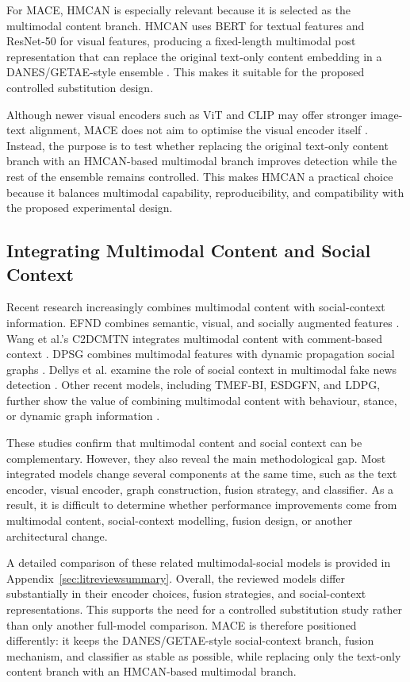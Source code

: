 For MACE, HMCAN is especially relevant because it is selected as the multimodal content branch. HMCAN uses BERT for textual features and ResNet-50 for visual features, producing a fixed-length multimodal post representation that can replace the original text-only content embedding in a DANES/GETAE-style ensemble \citep{Devlin2019,He2016,Qian2021}. This makes it suitable for the proposed controlled substitution design.

Although newer visual encoders such as ViT and CLIP may offer stronger image-text alignment, MACE does not aim to optimise the visual encoder itself \citep{Dosovitskiy2021,Radford2021}. Instead, the purpose is to test whether replacing the original text-only content branch with an HMCAN-based multimodal branch improves detection while the rest of the ensemble remains controlled. This makes HMCAN a practical choice because it balances multimodal capability, reproducibility, and compatibility with the proposed experimental design.

\subsection{Integrating Multimodal Content and Social Context}
\label{sec:integrating}

Recent research increasingly combines multimodal content with social-context information. EFND combines semantic, visual, and socially augmented features \citep{Nadeem2023}. Wang et al.'s C2DCMTN integrates multimodal content with comment-based context \citep{Wang2024}. DPSG combines multimodal features with dynamic propagation social graphs \citep{jing2025}. Dellys et al. examine the role of social context in multimodal fake news detection \citep{Dellys2025}. Other recent models, including TMEF-BI, ESDGFN, and LDPG, further show the value of combining multimodal content with behaviour, stance, or dynamic graph information \citep{Chen2025,Sun25,Ji2026LDPG}.

These studies confirm that multimodal content and social context can be complementary. However, they also reveal the main methodological gap. Most integrated models change several components at the same time, such as the text encoder, visual encoder, graph construction, fusion strategy, and classifier. As a result, it is difficult to determine whether performance improvements come from multimodal content, social-context modelling, fusion design, or another architectural change.

A detailed comparison of these related multimodal-social models is provided in Appendix~\ref{sec:litreviewsummary}. Overall, the reviewed models differ substantially in their encoder choices, fusion strategies, and social-context representations. This supports the need for a controlled substitution study rather than only another full-model comparison. MACE is therefore positioned differently: it keeps the DANES/GETAE-style social-context branch, fusion mechanism, and classifier as stable as possible, while replacing only the text-only content branch with an HMCAN-based multimodal branch.

